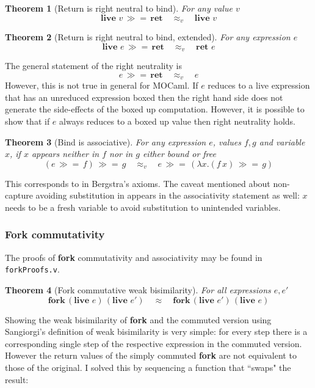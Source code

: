 \documentclass[12pt,twoside,notitlepage]{report}
\theoremstyle{plain}%
\newtheorem{thm}{Theorem}[section]
\theoremstyle{definition}
\theoremstyle{remark}
\begin{document}
\begin{thm}[Return is right neutral to bind]
For any value $ v$
\[  \textbf{live }v\,\gg=\, \textbf{ret}\quad \approx_v \quad \textbf{live }v \]
\end{thm}

\begin{thm}[Return is right neutral to bind, extended]
For any expression $ e$
\[  \textbf{live }e\,\gg=\, \textbf{ret}\quad \approx_v \quad \textbf{ret } e \]
\end{thm}

The general statement of the right neutrality is 
\[  e\,\gg=\, \textbf{ret}\quad \approx_v \quad e \]
However, this is not true in general for MOCaml. If $ e $ reduces to a live expression that has an unreduced expression boxed then the right hand side does not generate the side-effects of the boxed up computation. However, it is possible to show that if $ e $ always reduces to a boxed up value then right neutrality holds.

\begin{thm}[Bind is associative]
For any expression $ e $, values $ f, g $ and variable $ x $, if $ x $ appears neither in $ f $ nor in $ g $ either bound or free
\[ (e\, \gg=\, f) \, \gg=\, g \quad \approx_v \quad e\, \gg=\, (\lambda x. (f\, x) \, \gg=\, g ) \]
\end{thm}

This corresponds to  in Bergstra's axioms. The caveat mentioned about non-capture avoiding substitution in  appears in the associativity statement as well: $ x $ needs to be a fresh variable to avoid substitution to unintended variables.

\subsubsection{Fork commutativity}
The proofs of \textbf{fork} commutativity and associativity may be found in \verb|forkProofs.v|.

\begin{thm}[Fork commutative weak bisimilarity]
For all expressions $ e, e'$
\[  \textbf{fork}\,(\textbf{live }e)\,(\textbf{live }e')\quad \approx \quad \textbf{fork}\,(\textbf{live }e')\,(\textbf{live }e) \]
\end{thm}

Showing the weak bisimilarity of \textbf{fork} and the commuted version using Sangiorgi's definition of weak bisimilarity is very simple: for every step there is a corresponding single step of the respective expression in the commuted version. However the return values of the simply commuted \textbf{fork} are not equivalent to those of the original. I solved this by sequencing a function that ``swaps" the result:
\end{document}
